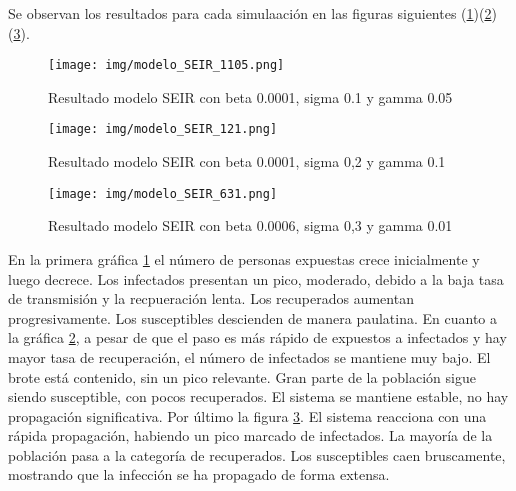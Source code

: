 Se observan los resultados para cada simulaación en las figuras siguientes (\ref{fig:Simulación 1 SEIR})(\ref{fig:Simulación 2 SEIR})(\ref{fig:Simulación 3 SEIR}).

\begin{figure}[H]
    \centering
    \texttt{[image: img/modelo\_SEIR\_1105.png]}
    \caption{Resultado modelo SEIR con beta 0.0001, sigma 0.1 y gamma 0.05}
    \label{fig:Simulación 1 SEIR}
    \vspace{0.5cm} %
\end{figure}

\begin{figure}[H]
    \centering
    \texttt{[image: img/modelo\_SEIR\_121.png]}
    \caption{Resultado modelo SEIR con beta 0.0001, sigma 0,2 y gamma 0.1}
    \label{fig:Simulación 2 SEIR}
    \vspace{0.5cm} %
\end{figure}

\begin{figure}[H]
    \centering
    \texttt{[image: img/modelo\_SEIR\_631.png]}
    \caption{Resultado modelo SEIR con beta 0.0006, sigma 0,3 y gamma 0.01}
    \label{fig:Simulación 3 SEIR}
    \vspace{0.5cm} %
\end{figure}

En la primera gráfica \ref{fig:Simulación 1 SEIR} el número de personas expuestas crece inicialmente y luego decrece. Los infectados presentan un pico, moderado, debido a la baja tasa de transmisión y la recpueración lenta. Los recuperados aumentan progresivamente. Los susceptibles descienden de manera paulatina. En cuanto a la gráfica \ref{fig:Simulación 2 SEIR}, a pesar de que el paso es más rápido de expuestos a infectados y hay mayor tasa de recuperación, el número de infectados se mantiene muy bajo. El brote está contenido, sin un pico relevante. Gran parte de la población sigue siendo susceptible, con pocos recuperados. El sistema se mantiene estable, no hay propagación significativa. Por último la figura \ref{fig:Simulación 3 SEIR}. El sistema reacciona con una rápida propagación, habiendo un pico marcado de infectados.
La mayoría de la población pasa a la categoría de recuperados.
Los susceptibles caen bruscamente, mostrando que la infección se ha propagado de forma extensa.





